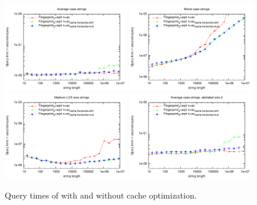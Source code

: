 \documentclass[a4]{article}
\begin{document}
\begin{figure}[tp]
    \begin{center}
        \includegraphics[width=0.49\textwidth,type=pdf,ext=.pdf,read=.pdf]{../src/results/length-fingerprint-cache-rand10.plt}
        \includegraphics[width=0.49\textwidth,type=pdf,ext=.pdf,read=.pdf]{../src/results/length-fingerprint-cache-alla.plt}
        \includegraphics[width=0.49\textwidth,type=pdf,ext=.pdf,read=.pdf]{../src/results/length-fingerprint-cache-repeat-pow.plt}
        \includegraphics[width=0.49\textwidth,type=pdf,ext=.pdf,read=.pdf]{../src/results/length-fingerprint-cache-rand2.plt}
    \end{center}
    \caption{\label{fig:plot-fingerprint-cache-horiz}Query times of \fprint[2] with and without cache optimization.}
\end{figure}
\end{document}
